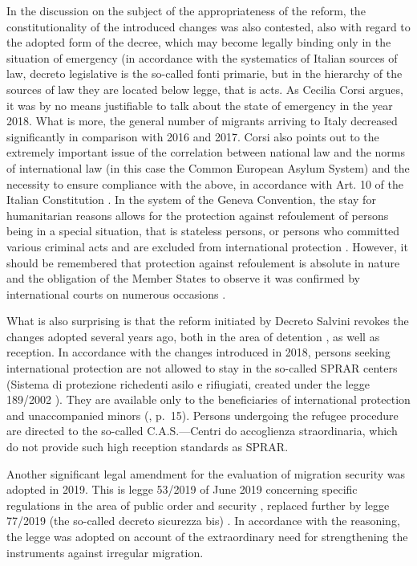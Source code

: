 \documentclass[10pt,a4paper]{article}
\begin{document}
\begin{multicols}{2}
In the discussion on the subject of the appropriateness of the reform, the constitutionality of the introduced changes \citep{R40,R41} was also contested, also with regard to the adopted form of the decree, which may become legally binding only in the situation of emergency (in accordance with the systematics of Italian sources of law, decreto legislative is the so-called fonti primarie, but in the hierarchy of the sources of law they are located below legge, that is acts. As Cecilia Corsi argues, it was by no means justifiable to talk about the state of emergency in the year 2018. What is more, the general number of migrants arriving to Italy decreased significantly in comparison with 2016 and 2017. Corsi also points out to the extremely important issue of the correlation between national law and the norms of international law (in this case the Common European Asylum System) and the necessity to ensure compliance with the above, in accordance with Art. 10 of the Italian Constitution \citep{R42}. In the system of the Geneva Convention, the stay for humanitarian reasons allows for the protection against refoulement of persons being in a special situation, that is stateless persons, or persons who committed various criminal acts and are excluded from international protection \citep{R43}. However, it should be remembered that protection against refoulement is absolute in nature and the obligation of the Member States to observe it was confirmed by international courts on numerous occasions \citep{R44,R45}.

What is also surprising is that the reform initiated by Decreto Salvini revokes the changes adopted several years ago, both in the area of detention \citep{R46,R47,R48}, as well as reception. In accordance with the changes introduced in 2018, persons seeking international protection are not allowed to stay in the so-called SPRAR centers (Sistema di protezione richedenti asilo e rifiugiati, created under the legge 189/2002 \citep{R49}). They are available only to the beneficiaries of international protection and unaccompanied minors (\citep{R50}, p.~15). Persons undergoing the refugee procedure are directed to the so-called C.A.S.---Centri do accoglienza straordinaria, which do not provide such high reception standards as SPRAR.

Another significant legal amendment for the evaluation of migration security was adopted in 2019. This is legge 53/2019 of June 2019 concerning specific regulations in the area of public order and security \citep{R51}, replaced further by legge 77/2019 (the so-called decreto sicurezza bis) \citep{R52}. In accordance with the reasoning, the legge was adopted on account of the extraordinary need for strengthening the instruments against irregular migration.


\end{multicols}
\end{document}
